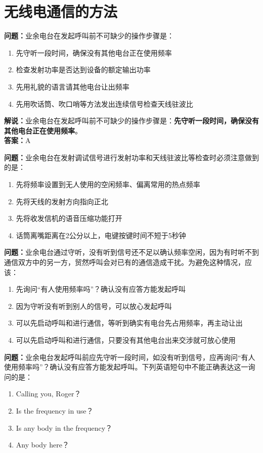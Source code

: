\chapter{无线电通信的方法}



\textbf{问题：}业余电台在发起呼叫前不可缺少的操作步骤是：
\begin{enumerate}[label=\Alph*), leftmargin=1cm]
	\item 先守听一段时间，确保没有其他电台正在使用频率
	\item 检查发射功率是否达到设备的额定输出功率
	\item 先用礼貌的语言请其他电台让出频率
	\item 先用吹话筒、吹口哨等方法发出连续信号检查天线驻波比
\end{enumerate}
\textbf{解说：}业余电台在发起呼叫前不可缺少的操作步骤是：\textbf{先守听一段时间，确保没有其他电台正在使用频率}。\\\textbf{答案：}A%


\textbf{问题：}业余电台在发射调试信号进行发射功率和天线驻波比等检查时必须注意做到的是：
\begin{enumerate}[label=\Alph*), leftmargin=1cm]
	\item 先将频率设置到无人使用的空闲频率、偏离常用的热点频率
	\item 先将天线的发射方向指向正北
	\item 先将收发信机的语音压缩功能打开
	\item 话筒离嘴距离在2公分以上，电键按键时间不短于5秒钟
\end{enumerate}

\textbf{问题：}业余电台通过守听，没有听到信号还不足以确认频率空闲，因为有时听不到通信双方中的另一方，贸然呼叫会对已有的通信造成干扰。为避免这种情况，应该：
\begin{enumerate}[label=\Alph*), leftmargin=1cm]
	\item 先询问“有人使用频率吗”？确认没有应答方能发起呼叫
	\item 因为守听没有听到别人的信号，可以放心发起呼叫
	\item 可以先启动呼叫和进行通信，等听到确实有电台先占用频率，再主动让出
	\item 可以先启动呼叫和进行通信，只要没有其他电台出来交涉就可放心使用
\end{enumerate}

\textbf{问题：}业余电台发起呼叫前应先守听一段时间，如没有听到信号，应再询问“有人使用频率吗”？确认没有应答方能发起呼叫。下列英语短句中不能正确表达这一询问的是：
\begin{enumerate}[label=\Alph*), leftmargin=1cm]
	\item Calling you, Roger？
	\item Is the frequency in use？
	\item Is any body in the frequency？
	\item Any body here？
\end{enumerate}

